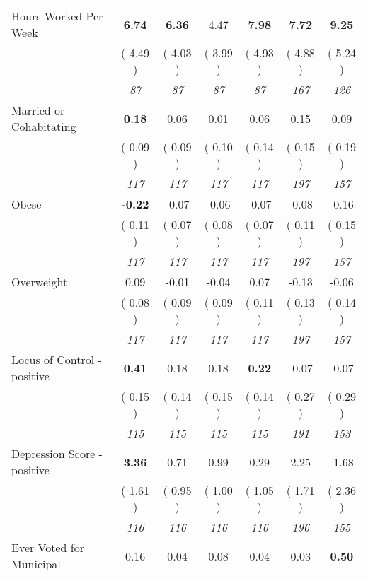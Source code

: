 \begin{tabular}{l c c c c c c}
Hours Worked Per Week & \textbf{      6.74 } & \textbf{      6.36 } &      4.47 & \textbf{     7.98} & \textbf{      7.72 } & \textbf{      9.25 } \\
& (     4.49 ) & (     4.03 ) & (     3.99 ) & (     4.93 ) & (     4.88 ) & (     5.24 ) \\
& \textit{ 87 } & \textit{ 87 } & \textit{ 87 } & \textit{ 87 } & \textit{ 167 } & \textit{ 126 } \\
Married or Cohabitating & \textbf{      0.18 } &      0.06 &      0.01 &      0.06 &      0.15 &      0.09 \\
& (     0.09 ) & (     0.09 ) & (     0.10 ) & (     0.14 ) & (     0.15 ) & (     0.19 ) \\
& \textit{ 117 } & \textit{ 117 } & \textit{ 117 } & \textit{ 117 } & \textit{ 197 } & \textit{ 157 } \\
Obese & \textbf{     -0.22 } &     -0.07 &     -0.06 &     -0.07 &     -0.08 &     -0.16 \\
& (     0.11 ) & (     0.07 ) & (     0.08 ) & (     0.07 ) & (     0.11 ) & (     0.15 ) \\
& \textit{ 117 } & \textit{ 117 } & \textit{ 117 } & \textit{ 117 } & \textit{ 197 } & \textit{ 157 } \\
Overweight &      0.09 &     -0.01 &     -0.04 &      0.07 &     -0.13 &     -0.06 \\
& (     0.08 ) & (     0.09 ) & (     0.09 ) & (     0.11 ) & (     0.13 ) & (     0.14 ) \\
& \textit{ 117 } & \textit{ 117 } & \textit{ 117 } & \textit{ 117 } & \textit{ 197 } & \textit{ 157 } \\
Locus of Control - positive & \textbf{      0.41 } &      0.18 &      0.18 & \textbf{     0.22} &     -0.07 &     -0.07 \\
& (     0.15 ) & (     0.14 ) & (     0.15 ) & (     0.14 ) & (     0.27 ) & (     0.29 ) \\
& \textit{ 115 } & \textit{ 115 } & \textit{ 115 } & \textit{ 115 } & \textit{ 191 } & \textit{ 153 } \\
Depression Score - positive & \textbf{      3.36 } &      0.71 &      0.99 &      0.29 &      2.25 &     -1.68 \\
& (     1.61 ) & (     0.95 ) & (     1.00 ) & (     1.05 ) & (     1.71 ) & (     2.36 ) \\
& \textit{ 116 } & \textit{ 116 } & \textit{ 116 } & \textit{ 116 } & \textit{ 196 } & \textit{ 155 } \\
Ever Voted for Municipal &      0.16 &      0.04 &      0.08 &      0.04 &      0.03 & \textbf{      0.50 } \\

\end{tabular}
